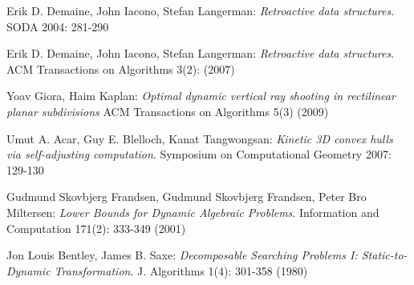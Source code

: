 \documentclass[11pt]{article}
\begin{document}
\begin{thebibliography}{77}

Erik D. Demaine, John Iacono, Stefan Langerman: \emph{Retroactive data structures}. SODA 2004: 281-290

Erik D. Demaine, John Iacono, Stefan Langerman: \emph{Retroactive data structures}. ACM Transactions on Algorithms 3(2): (2007)

Yoav Giora, Haim Kaplan: \emph{Optimal dynamic vertical ray shooting in rectilinear planar subdivisions} ACM Transactions on Algorithms 5(3) (2009)

 Umut A. Acar, Guy E. Blelloch, Kanat Tangwongsan: \emph{Kinetic 3D convex hulls via self-adjusting computation}. Symposium on Computational Geometry 2007: 129-130

Gudmund Skovbjerg Frandsen, Gudmund Skovbjerg Frandsen, Peter Bro Miltersen: \emph{Lower Bounds for Dynamic Algebraic Problems}. Information and Computation 171(2): 333-349 (2001)

Jon Louis Bentley, James B. Saxe: \emph{Decomposable Searching Problems I: Static-to-Dynamic Transformation}. J. Algorithms 1(4): 301-358 (1980)

\end{thebibliography}
\end{document}
